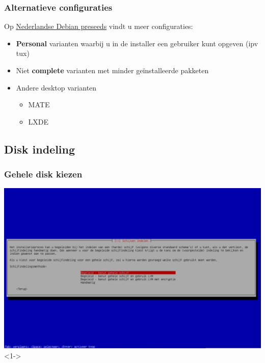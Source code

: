 \documentclass{beamer}
\begin{document}
\begin{frame}
   \frametitle{Alternatieve configuraties}
   Op \href{https://slspeek.github.io/debian/}{Nederlandse Debian preseeds} vindt u meer configuraties:
   \begin{itemize}
      \item \textbf{Personal} varianten waarbij u in de installer een gebruiker kunt opgeven (ipv tux)
      \item Niet \textbf{complete} varianten met minder ge\"{i}nstalleerde pakketen
      \item Andere desktop varianten \begin{itemize}
         \item MATE
         \item LXDE
      \end{itemize}

   \end{itemize}

\end{frame}

\subsection{Disk indeling}
\begin{frame}
   \frametitle{Gehele disk kiezen}
   \centering
   \includegraphics[width=\textwidth]{img/gehele-disk-kiezen.png}<1->
\end{frame}
\end{document}
